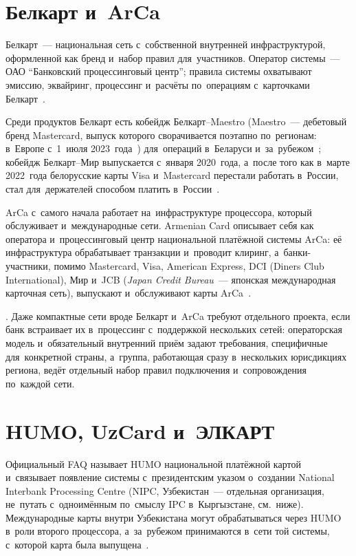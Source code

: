 \section{Белкарт и~ArCa}\label{sec:regional-belkart-arca}

Белкарт~--- национальная сеть с~собственной внутренней инфраструктурой,
оформленной как бренд и~набор правил для~участников. Оператор системы~--- ОАО
\enquote{Банковский процессинговый центр}; правила системы охватывают эмиссию,
эквайринг, процессинг и~расчёты по~операциям с~карточками
Белкарт~\cite{belkart-about}.

Среди продуктов Белкарт есть кобейдж
Белкарт--Maestro (Maestro~--- дебетовый бренд Mastercard, выпуск которого
сворачивается поэтапно по~регионам: в~Европе с~1~июля 2023~года~\cite{adyen-maestro-phaseout}) для~операций в~Беларуси и~за~рубежом~\cite{belkart-cards};
кобейдж Белкарт--Мир выпускается с~января 2020~года, а~после того как
в~марте 2022~года белорусские карты Visa и~Mastercard перестали работать
в~России, стал для~держателей способом платить в~России~\cite{onliner-belkart-mir-2022}.

ArCa с~самого начала работает на~инфраструктуре процессора, который обслуживает
и~международные сети. Armenian Card описывает себя как оператора
и~процессинговый центр национальной платёжной системы ArCa: её инфраструктура
обрабатывает транзакции и~проводит клиринг, а~банки-участники, помимо
Mastercard, Visa, American Express, DCI (Diners Club International), Мир и~JCB
(\textit{Japan Credit Bureau}~--- японская международная карточная сеть),
выпускают и~обслуживают карты ArCa~\cite{arca-about}.

.
Даже компактные сети вроде Белкарт и~ArCa требуют
отдельного проекта, если банк встраивает их в~процессинг с~поддержкой
нескольких сетей: операторская модель и~обязательный внутренний приём задают
требования, специфичные для~конкретной страны, а~группа, работающая сразу
в~нескольких юрисдикциях региона, ведёт отдельный набор правил подключения
и~сопровождения по~каждой сети.

\section{HUMO, UzCard и~ЭЛКАРТ}\label{sec:regional-humo-uzcard-elkart}

Официальный FAQ называет HUMO национальной платёжной картой и~связывает
появление системы с~президентским указом о~создании National Interbank
Processing Centre (NIPC, Узбекистан~--- отдельная организация, не~путать
с~одноимённым по~смыслу IPC в~Кыргызстане, см.~ниже). Международные карты
внутри Узбекистана могут обрабатываться через HUMO в~роли второго процессора,
а~за~рубежом принимаются в~сети той системы, с~которой карта была
выпущена~\cite{humo-faq}.

